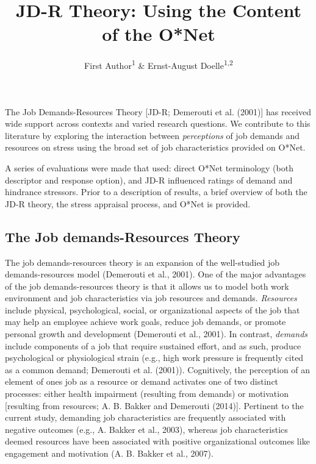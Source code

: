 \documentclass[
  man]{apa6}
\title{JD-R Theory: Using the Content of the O*Net}
\author{First Author\textsuperscript{1} \& Ernst-August Doelle\textsuperscript{1,2}}
\date{}
\affiliation{\vspace{0.5cm}\textsuperscript{1} Wilhelm-Wundt-University\\\textsuperscript{2} Konstanz Business School}
\begin{document}
\maketitle

The Job Demands-Resources Theory {[}JD-R; Demerouti et al. (2001){]} has received wide support across contexts and varied research questions. We contribute to this literature by exploring the interaction between \emph{perceptions} of job demands and resources on stress using the broad set of job characteristics provided on O*Net.

A series of evaluations were made that used: direct O*Net terminology (both descriptor and response option), and JD-R influenced ratings of demand and hindrance stressors. Prior to a description of results, a brief overview of both the JD-R theory, the stress appraisal process, and O*Net is provided.

\hypertarget{the-job-demands-resources-theory}{%
\subsection{The Job demands-Resources Theory}\label{the-job-demands-resources-theory}}

The job demands-resources theory is an expansion of the well-studied job demands-resources model (Demerouti et al., 2001). One of the major advantages of the job demands-resources theory is that it allows us to model both work environment and job characteristics via job resources and demands. \emph{Resources} include physical, psychological, social, or organizational aspects of the job that may help an employee achieve work goals, reduce job demands, or promote personal growth and development (Demerouti et al., 2001). In contrast, \emph{demands} include components of a job that require sustained effort, and as such, produce psychological or physiological strain (e.g., high work pressure is frequently cited as a common demand; Demerouti et al. (2001)).
Cognitively, the perception of an element of ones job as a resource or demand activates one of two distinct processes: either health impairment (resulting from demands) or motivation {[}resulting from resources; A. B. Bakker and Demerouti (2014){]}. Pertinent to the current study, demanding job characteristics are frequently associated with negative outcomes (e.g., A. Bakker et al., 2003), whereas job characteristics deemed resources have been associated with positive organizational outcomes like engagement and motivation (A. B. Bakker et al., 2007).
\end{document}
